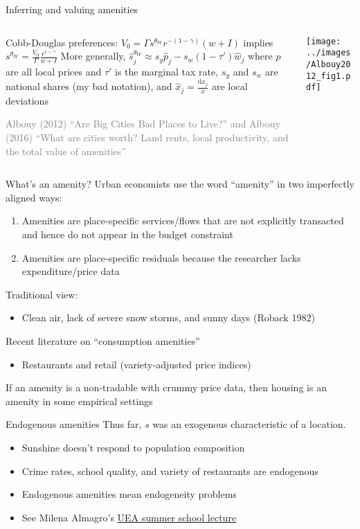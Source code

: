 \documentclass[11pt,notes=hide,aspectratio=169]{beamer}
\begin{document}
\begin{frame}{Inferring and valuing amenities}
\begin{columns}
\begin{column}{0.49\textwidth}
Cobb-Douglas preferences:
$V_0  = 
\Gamma
s^{\theta_W}
r^{-(1-\gamma)}
(w + I)$
implies
$
s^{\theta_W} = \frac{V_0}{\Gamma} \frac{r^{1-\gamma}}{w+I} 
$
\smallskip
More generally,
$\hat{s}_j^{\theta_W} \approx s_y \hat{p}_j - s_w (1-\tau')\hat{w}_j$
where $p$ are all local prices and $\tau'$ is the marginal tax rate,
$s_y$ and $s_w$ are national shares (my bad notation), and $\hat{x}_j = \frac{\textrm{d} x_j}{x}$ are local deviations
{\scriptsize \textcolor{gray}{
Albouy (2012) ``Are Big Cities Bad Places to Live?''
and
Albouy (2016) ``What are cities worth? Land rents, local productivity, and the total value of amenities''
}\par}
\end{column}
\begin{column}{0.40\textwidth}
\texttt{[image: ../images/Albouy2012\_fig1.pdf]}
\end{column}
\end{columns}
\end{frame}
\begin{frame}{What's an amenity?}
Urban economists use the word ``amenity'' in two imperfectly aligned ways:
\begin{enumerate}
\item Amenities are place-specific services/flows that are not explicitly transacted and hence do not appear in the budget constraint
\item Amenities are place-specific residuals because the researcher lacks expenditure/price data
\end{enumerate}
Traditional view:
\begin{itemize}
\item Clean air, lack of severe snow storms, and sunny days (Roback 1982)
\end{itemize}
Recent literature on ``consumption amenities''
\begin{itemize}
\item Restaurants and retail (variety-adjusted price indices)
\end{itemize}
If an amenity is a non-tradable with crummy price data, then housing is an amenity in some empirical settings
\end{frame}
\begin{frame}{Endogenous amenities}
Thus far, $s$ was an exogenous characteristic of a location.
\begin{itemize}
\item Sunshine doesn't respond to population composition
\item Crime rates, school quality, and variety of restaurants are endogenous
\item Endogenous amenities mean endogeneity problems
\item See Milena Almagro's \href{https://m-almagro.github.io/UEA_Summer_School_2023.pdf}{UEA summer school lecture}
\end{itemize}
\end{frame}
\end{document}
